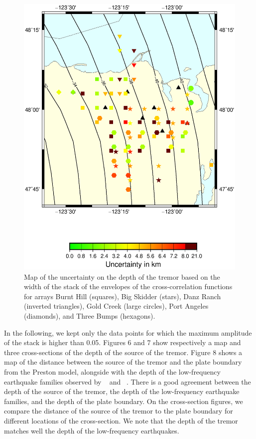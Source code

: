 \documentclass[draft]{agujournal2019}
\begin{document}
\begin{figure}
\noindent\includegraphics[width=\textwidth, trim={1cm 5cm 3.5cm 4cm},clip]{figures/uncertainty_PWS_PWS.eps}
\caption{Map of the uncertainty on the depth of the tremor based on the width of the stack of the envelopes of the cross-correlation functions for arrays Burnt Hill (squares), Big Skidder (stars), Danz Ranch (inverted triangles),  Gold Creek (large circles), Port Angeles (diamonds), and Three Bumps (hexagons).}
\label{pngfiguresample}
\end{figure}

In the following, we kept only the data points for which the maximum amplitude of the stack is higher than 0.05. Figures 6 and 7 show respectively a map and three cross-sections of the depth of the source of the tremor. Figure 8 shows a map of the distance between the source of the tremor and the plate boundary from the Preston model, alongside with the depth of the low-frequency earthquake families observed by ~ and ~. There is a good agreement between the depth of the source of the tremor, the depth of the low-frequency earthquake families, and the depth of the plate boundary. On the cross-section figures, we compare the distance of the source of the tremor to the plate boundary for different locations of the cross-section. We note that the depth of the tremor matches well the depth of the low-frequency earthquakes. \\
\end{document}
